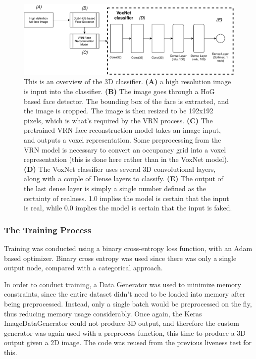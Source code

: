 \documentclass[10pt,a4paper]{article}
\begin{document}
            \begin{figure}
                \centering
                \includegraphics[width=.7\linewidth]{voxnet.pdf}
                \caption{
                    This is an overview of the 3D classifier. \textbf{(A)} a high resolution image is input into the classifier. \textbf{(B)} The image goes through a HoG based face detector. The bounding box of the face is extracted, and the image is cropped. 
                    The image is then resized to be 192x192 pixels, which is what's required by the VRN process.
                    \textbf{(C)} The pretrained VRN face reconstruction model takes an image input, and outputs a voxel representation. Some preprocessing from the VRN model 
                    is necessary to convert an occupancy grid into a voxel representation (this is done here rather than in the VoxNet model).
                    \textbf{(D)} The VoxNet classifier uses several 3D convolutional layers, along with a couple of Dense layers to classify.
                    \textbf{(E)} The output of the last dense layer is simply a single number defined as the certainty of realness. 1.0 implies the model is certain that the input is real, while 0.0 implies the model is certain that the input is faked.
                }
                \label{3DClassifierArchitectureDiagram}
            \end{figure}

        \subsubsection{The Training Process}
            Training was conducted using a binary cross-entropy loss function, with an Adam based optimizer. Binary cross entropy was used since there was only a single output node,
            compared with a categorical approach. 


            In order to conduct training, a Data Generator was used to minimize memory constraints, since the entire dataset didn't need to be loaded into memory after being preprocessed. Instead,
            only a single batch would be preprocessed on the fly, thus reducing memory usage considerably. Once again, the Keras ImageDataGenerator could not produce 3D output, and therefore
            the custom generator was again used with a preprocess function, this time to produce a 3D output given a 2D image. The code was reused from the previous liveness test for this.
\end{document}
